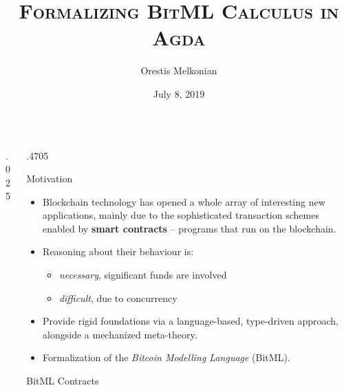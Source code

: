 \documentclass[final,hyperref={pdfpagelabels=false}]{beamer}
\title{\LARGE \textsc{Formalizing BitML Calculus in Agda}}
\author{Orestis Melkonian}
\date{July 8, 2019}
\institute{Utrecht University, The Netherlands}
\newcommand\sepsize{.025\textwidth}
\newcommand\colsize{.4705\textwidth}
\begin{document}

\begin{frame}[t] %

\begin{columns}[t] %

\begin{column}{\sepsize}\end{column} %

\begin{column}{\colsize} %


\begin{block}{Motivation}
\begin{itemize}

\item Blockchain technology has opened a whole array of interesting new applications,
mainly due to the sophisticated transaction schemes enabled by \textbf{smart contracts}
-- programs that run on the blockchain.

\item Reasoning about their behaviour is:
  \begin{itemize}
  \item \textit{necessary}, significant funds are involved
  \item \textit{difficult}, due to concurrency
  \end{itemize}

\item Provide rigid foundations via a language-based, type-driven approach, alongside a mechanized meta-theory.

\item Formalization of the \textit{Bitcoin Modelling Language} (BitML).

\end{itemize}
\end{block}

\begin{block}{BitML Contracts}
\begin{itemize}


\end{itemize}
\end{block}
\end{column}
\end{columns}
\end{frame}
\end{document}
